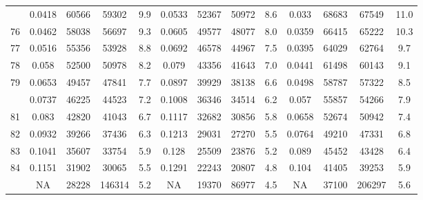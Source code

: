\documentclass[
  14pt,
]{article}
\begin{document}
\begin{longtable}[t]{lcccccccccccc}
\addlinespace
75 & 0.0418 & 60566 & 59302 & 9.9 & 0.0533 & 52367 & 50972 & 8.6 & 0.033 & 68683 & 67549 & 11.0\\
76 & 0.0462 & 58038 & 56697 & 9.3 & 0.0605 & 49577 & 48077 & 8.0 & 0.0359 & 66415 & 65222 & 10.3\\
77 & 0.0516 & 55356 & 53928 & 8.8 & 0.0692 & 46578 & 44967 & 7.5 & 0.0395 & 64029 & 62764 & 9.7\\
78 & 0.058 & 52500 & 50978 & 8.2 & 0.079 & 43356 & 41643 & 7.0 & 0.0441 & 61498 & 60143 & 9.1\\
79 & 0.0653 & 49457 & 47841 & 7.7 & 0.0897 & 39929 & 38138 & 6.6 & 0.0498 & 58787 & 57322 & 8.5\\
\addlinespace
80 & 0.0737 & 46225 & 44523 & 7.2 & 0.1008 & 36346 & 34514 & 6.2 & 0.057 & 55857 & 54266 & 7.9\\
81 & 0.083 & 42820 & 41043 & 6.7 & 0.1117 & 32682 & 30856 & 5.8 & 0.0658 & 52674 & 50942 & 7.4\\
82 & 0.0932 & 39266 & 37436 & 6.3 & 0.1213 & 29031 & 27270 & 5.5 & 0.0764 & 49210 & 47331 & 6.8\\
83 & 0.1041 & 35607 & 33754 & 5.9 & 0.128 & 25509 & 23876 & 5.2 & 0.089 & 45452 & 43428 & 6.4\\
84 & 0.1151 & 31902 & 30065 & 5.5 & 0.1291 & 22243 & 20807 & 4.8 & 0.104 & 41405 & 39253 & 5.9\\
\addlinespace
85 & NA & 28228 & 146314 & 5.2 & NA & 19370 & 86977 & 4.5 & NA & 37100 & 206297 & 5.6\\*
\end{longtable}
\end{document}

